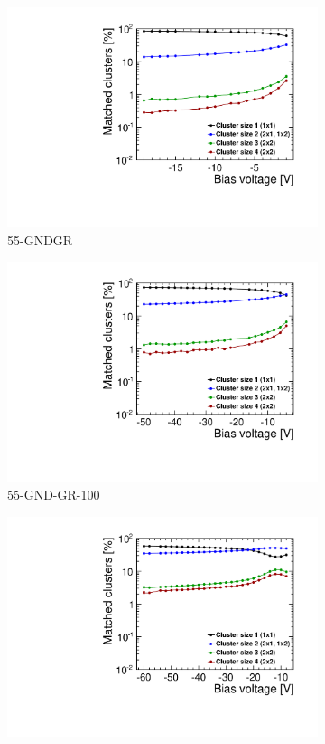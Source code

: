 \begin{figure}[htbp]
  \begin{subfigure}[b]{0.33\textwidth}
    \includegraphics[width=\textwidth]{./figures/TestBeam/cluSize_biasScan_W0019_C07.pdf}
    \caption{55-GNDGR}
  \end{subfigure} \hfill
  \begin{subfigure}[b]{0.33\textwidth}
    \includegraphics[width=\textwidth]{./figures/TestBeam/cluSize_biasScan_W0005_E02.pdf}
    \caption{55-GND-GR-100}
  \end{subfigure}\hfill
  \begin{subfigure}[b]{0.33\textwidth}
    \includegraphics[width=\textwidth]{./figures/TestBeam/cluSize_biasScan_W0005_F01.pdf}

\end{subfigure}
\end{figure}
